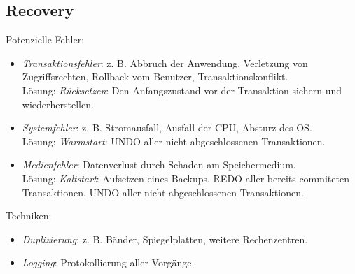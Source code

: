 \documentclass[a4paper,parskip=half*,DIV=15,fontsize=11pt]{scrartcl}
\begin{document}
\begin{minipage}[t]{0.45\textwidth}
\subsection{Recovery}
Potenzielle Fehler:
\begin{itemize}
\item \emph{Transaktionsfehler}: z. B. Abbruch der Anwendung, Verletzung von Zugriffsrechten, Rollback vom Benutzer, Transaktionskonflikt. \\
Lösung: \emph{Rücksetzen}: Den Anfangszustand vor der Transaktion sichern und wiederherstellen.
\item \emph{Systemfehler}: z. B. Stromausfall, Ausfall der CPU, Absturz des OS. \\
Lösung: \emph{Warmstart}: UNDO aller nicht abgeschlossenen Transaktionen.
\item \emph{Medienfehler}: Datenverlust durch Schaden am Speichermedium. \\
Lösung: \emph{Kaltstart}: Aufsetzen eines Backups. REDO aller bereits commiteten Transaktionen. UNDO aller nicht abgeschlossenen Transaktionen.
\end{itemize}
Techniken:
\begin{itemize}
\item \emph{Duplizierung}: z. B. Bänder, Spiegelplatten, weitere Rechenzentren.
\item \emph{Logging}: Protokollierung aller Vorgänge.
\end{itemize}
\end{minipage}
\begin{minipage}[t]{0.1\textwidth}
\begin{center}

\end{center}
\end{minipage}
\end{document}
